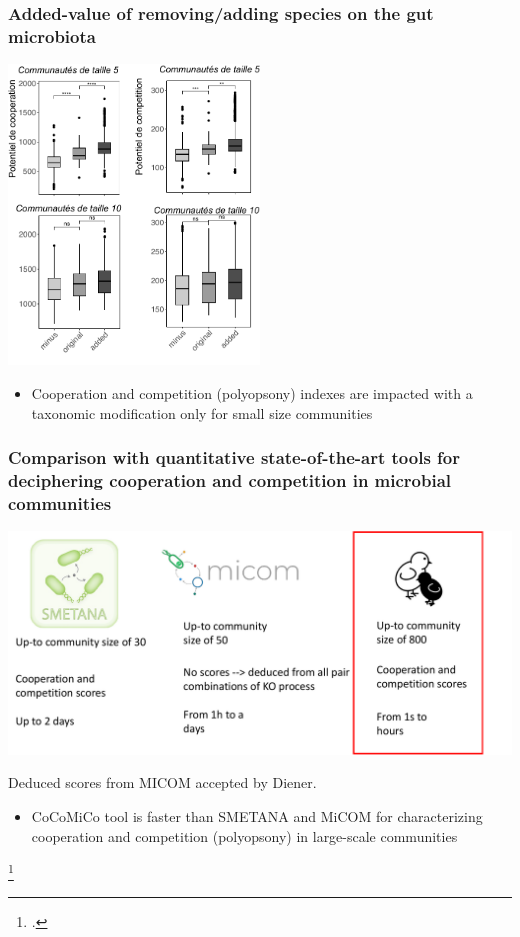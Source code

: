 \documentclass[8pt,usenames,dvipsnames]{beamer}
\begin{document}
\begin{frame}
\frametitle{Added-value of removing/adding species on the gut microbiota}
\centering
\includegraphics[width=0.5\textwidth]{figures/added-value.pdf}
\begin{alertblock}{}
\begin{itemize}
\item Cooperation and competition (polyopsony)  indexes are impacted with a taxonomic modification only for small size communities
\end{itemize}
\end{alertblock}
\end{frame}

\begin{frame}
\frametitle{Comparison with quantitative state-of-the-art tools for deciphering cooperation and competition in microbial communities}
\includegraphics[width=\textwidth]{figures/comparaison-sota-coop-comp.pdf}

Deduced scores from MICOM accepted by Diener.

\begin{alertblock}{}
\begin{itemize}
\item CoCoMiCo tool is faster than SMETANA and MiCOM for characterizing cooperation and competition (polyopsony) in large-scale communities
\end{itemize}
\end{alertblock}

\footcite{Zelezniak2015,diener2020}
\end{frame}
\end{document}

